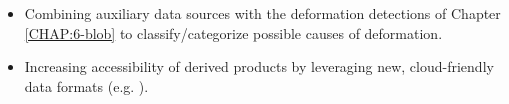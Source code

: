 \begin{itemize}
\item Combining auxiliary data sources with the deformation detections of Chapter \ref{CHAP:6-blob} to classify/categorize possible causes of deformation. 

\item Increasing accessibility of derived products by leveraging new, cloud-friendly data formats (e.g. \cite{Kellndorfer2022GlobalSeasonalSentinel}).


\end{itemize}

